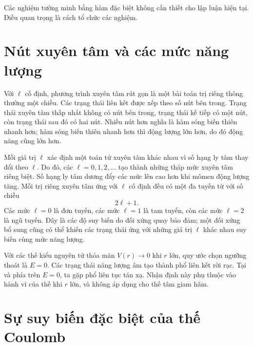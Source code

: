 \begin{classroomqa}\end{classroomqa}

Các nghiệm tường minh bằng hàm đặc biệt không cần thiết cho lập luận hiện tại. Điều quan trọng là cách tổ chức các nghiệm.

\section{Nút xuyên tâm và các mức năng lượng}

Với \(\ell\) cố định, phương trình xuyên tâm rút gọn là một bài toán trị riêng thông thường một chiều. Các trạng thái liên kết được xếp theo số nút bên trong. Trạng thái xuyên tâm thấp nhất không có nút bên trong, trạng thái kế tiếp có một nút, còn trạng thái sau đó có hai nút. Nhiều nút hơn nghĩa là hàm sóng biến thiên nhanh hơn; hàm sóng biến thiên nhanh hơn thì động lượng lớn hơn, do đó động năng cũng lớn hơn.

Mỗi giá trị \(\ell\) xác định một toán tử xuyên tâm khác nhau vì số hạng ly tâm thay đổi theo \(\ell\). Do đó, các \(\ell=0,1,2,\ldots\) tạo thành những tháp mức xuyên tâm riêng biệt. Số hạng ly tâm dương đẩy các mức lên cao hơn khi mômen động lượng tăng. Mỗi trị riêng xuyên tâm ứng với \(\ell\) cố định đều có một đa tuyến từ với số chiều
\begin{equation}
2\ell+1.
\end{equation}
Các mức \(\ell=0\) là đơn tuyến, các mức \(\ell=1\) là tam tuyến, còn các mức \(\ell=2\) là ngũ tuyến. Đây là các độ suy biến do đối xứng quay bảo đảm; một đối xứng bổ sung cũng có thể khiến các trạng thái ứng với những giá trị \(\ell\) khác nhau suy biến cùng mức năng lượng.

Với các thế kiểu nguyên tử thỏa mãn \(V(r)\to0\) khi \(r\) lớn, quy ước chọn ngưỡng thoát là \(E=0\). Các trạng thái năng lượng âm tạo thành phổ liên kết rời rạc. Tại và phía trên \(E=0\), ta gặp phổ liên tục tán xạ. Nhận định này phụ thuộc vào hành vi của thế khi \(r\) lớn, và không áp dụng cho thế tâm giam hãm.

\section{Sự suy biến đặc biệt của thế Coulomb}

